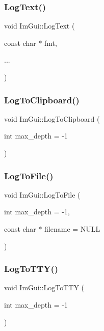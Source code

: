 \subsubsection{\texorpdfstring{Log\+Text()}{LogText()}}
{\footnotesize\ttfamily void Im\+Gui\+::\+Log\+Text (\begin{DoxyParamCaption}\item[{const char $\ast$}]{fmt,  }\item[{}]{... }\end{DoxyParamCaption})}

\mbox{\label{namespace_im_gui_a81add991d176834b8a6e315dfc78e4f7}} 
\subsubsection{\texorpdfstring{Log\+To\+Clipboard()}{LogToClipboard()}}
{\footnotesize\ttfamily void Im\+Gui\+::\+Log\+To\+Clipboard (\begin{DoxyParamCaption}\item[{int}]{max\+\_\+depth = {\ttfamily -\/1} }\end{DoxyParamCaption})}

\mbox{\label{namespace_im_gui_ab62461a65c153b9f40842debef8aa755}} 
\subsubsection{\texorpdfstring{Log\+To\+File()}{LogToFile()}}
{\footnotesize\ttfamily void Im\+Gui\+::\+Log\+To\+File (\begin{DoxyParamCaption}\item[{int}]{max\+\_\+depth = {\ttfamily -\/1},  }\item[{const char $\ast$}]{filename = {\ttfamily NULL} }\end{DoxyParamCaption})}

\mbox{\label{namespace_im_gui_a37696f5296f33ae4218f53b40b81cccc}} 
\subsubsection{\texorpdfstring{Log\+To\+T\+T\+Y()}{LogToTTY()}}
{\footnotesize\ttfamily void Im\+Gui\+::\+Log\+To\+T\+TY (\begin{DoxyParamCaption}\item[{int}]{max\+\_\+depth = {\ttfamily -\/1} }\end{DoxyParamCaption})}

